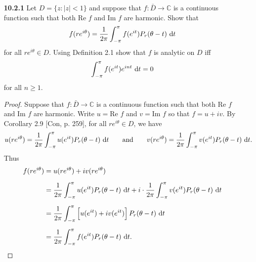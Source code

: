 \documentclass[11pt,oneside,english]{amsart}
\theoremstyle{definition}
\newcommand{\aspace}{\hspace{7mm}\text{and}\hspace{7mm}}
\renewcommand{\Re}{\text{Re }}
\renewcommand{\Im}{\text{Im }}
\newcommand{\MB}[1]{\mathbb{#1}}
\begin{document}
\begin{enumerate}[leftmargin=*]
\begin{proof}
Let $G$ be a region and let $u:G\to \MB{R}$ be a nonconstant harmonic function. Let $O\subseteq G$ be an open set. Then it can be written as a union of open discs, say $O=\bigcup_{\alpha\in A}D_\alpha$ where $A$ is an index set. Since each $D_\alpha$ is connected, by a topological argument, $u(D_\alpha)$ is connected as well, but since $u$ is nonconstant, and the connected components of $\MB{R}$ are intervals, we must have that $u(D_\alpha)$ is an interval for every $\alpha$. Now, each $D_\alpha$ is a region and since $u$ is harmonic it is continuous. Thus, since $u$ is nonconstant on $D_\alpha$ for each $\alpha$, by the \textit{contrapositives} of the Maximum and Minimum Principles [Con, p. 253, 255], $u$ does not attain a maximum nor a minimum on each $D_\alpha$, and since these maxima and minima correspond to the endpoints of an interval in $\MB{R}$, it must be the case that $u(D_\alpha)$ is an interval that does not contain the endpoints, i.e. an open interval. Thus,
\[
u(O)=u\left(\bigcup_{\alpha\in A}D_\alpha\right)=\bigcup_{\alpha\in A}u(D_\alpha)
\]
is a union of open sets and so is open. Since $O\subseteq G$ was chosen arbitrarily, we have shown that $u$ is an open map.
\end{proof}

\pagebreak

\item[\textbf{10.2.1}] Let $D=\{z:|z|<1\}$ and suppose that $f:\bar D\to\MB{C}$ is a continuous function such that both $\Re f$ and $\Im f$ are harmonic. Show that
\[
f(re^{i\theta})=\frac{1}{2\pi}\int_{-\pi}^\pi f(e^{it})P_r(\theta-t)\,\dif{t}
\]
for all $re^{i\theta}\in D$. Using Definition 2.1 show that $f$ is analytic on $D$ iff
\[
\int_{-\pi}^\pi f(e^{it})e^{int}\,\dif{t}=0
\]
for all $n\geq 1$.

\begin{proof}
Suppose that $f:\bar D\to\MB{C}$ is a continuous function such that both $\Re f$ and $\Im f$ are harmonic. Write $u=\Re f$ and $v=\Im f$ so that $f=u+iv$. By Corollary 2.9 [Con, p. 259], for all $re^{i\theta}\in D$, we have
\[
u(re^{i\theta})=\frac{1}{2\pi}\int_{-\pi}^\pi u(e^{it})P_r(\theta-t)\,\dif{t}\aspace v(re^{i\theta})=\frac{1}{2\pi}\int_{-\pi}^\pi v(e^{it})P_r(\theta-t)\,\dif{t}.
\]
Thus
\begin{align*}
f(re^{i\theta})&=u(re^{i\theta})+iv(re^{i\theta})\\[2mm]
&=\frac{1}{2\pi}\int_{-\pi}^\pi u(e^{it})P_r(\theta-t)\,\dif{t}+i\cdot\frac{1}{2\pi}\int_{-\pi}^\pi v(e^{it})P_r(\theta-t)\,\dif{t}\\[2mm]
&=\frac{1}{2\pi}\int_{-\pi}^\pi \left[u(e^{it})+iv(e^{it})\right]P_r(\theta-t)\,\dif{t}\\[2mm]
&=\frac{1}{2\pi}\int_{-\pi}^\pi f(e^{it})P_r(\theta-t)\,\dif{t}.
\end{align*}


\end{proof}
\end{enumerate}
\end{document}
